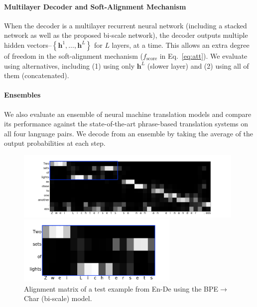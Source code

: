 \documentclass[11pt]{article}
\newcommand{\vect}[1]{\mathbf{#1}}
\newcommand{\vh}[0]{\vect{h}}
\begin{document}
\paragraph{Multilayer Decoder and Soft-Alignment Mechanism}

When the decoder is a multilayer recurrent neural network (including a stacked
network as well as the proposed bi-scale network), the decoder outputs multiple
hidden vectors--$\left\{\vh^1, \ldots, \vh^L\right\}$ for $L$ layers, at a time.
This allows an extra degree of freedom in the soft-alignment mechanism
($f_{\mathrm{score}}$ in Eq.~\eqref{eq:att}). We evaluate using alternatives,
including (1) using only $\vh^L$ (slower layer) and
(2) using all of them
(concatenated).

\paragraph{Ensembles}

We also evaluate an ensemble of neural machine translation models and compare
its performance against the state-of-the-art phrase-based translation systems on
all four language pairs. We decode from an ensemble by taking the
average of the output probabilities at each step.

\begin{figure}[ht]
    \begin{minipage}{0.6\textwidth}
        \centering
        \includegraphics[height=3.3cm,clip=True,trim=110 0 110 0]{align_example_box_1.pdf}
    \end{minipage}
    \begin{minipage}{0.3\textwidth}
        \includegraphics[height=3.3cm,clip=True,trim=40 0 40 0]{align_example_zoom_1.pdf}
    \end{minipage}
    \hfill
    \caption{Alignment matrix of a test example from En-De
             using the BPE$\rightarrow$Char (bi-scale) model.}
    \label{fig:align}

\end{figure}
\end{document}
